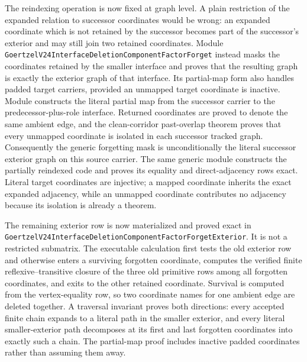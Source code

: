 \documentclass[11pt]{article}
\theoremstyle{definition}
\begin{document}
The reindexing operation is now fixed at graph level.  A plain restriction of
the expanded relation to successor coordinates would be wrong: an expanded
coordinate which is not retained by the successor becomes part of the
successor's exterior and may still join two retained coordinates.  Module
\texttt{GoertzelV24InterfaceDeletionComponentFactorForget} instead masks the
coordinates retained by the smaller interface and proves that the resulting
graph is exactly the exterior graph of that interface.  Its partial-map form
also handles padded target carriers, provided an unmapped target coordinate is
inactive.  Module
constructs the literal partial map from the successor carrier to the
predecessor-plus-role interface.  Returned coordinates are proved to denote
the same ambient edge, and the clean-corridor past-overlap theorem proves that
every unmapped coordinate is isolated in each successor tracked graph.
Consequently the generic forgetting mask is unconditionally the literal
successor exterior graph on this source carrier.  The same generic module
constructs the partially reindexed code and proves its equality and
direct-adjacency rows exact.  Literal target coordinates are injective; a
mapped coordinate inherits the exact expanded adjacency, while an unmapped
coordinate contributes no adjacency because its isolation is already a
theorem.

The remaining exterior row is now materialized and proved exact in
\texttt{GoertzelV24InterfaceDeletionComponentFactorForgetExterior}.  It is not
a restricted submatrix.  The executable calculation first tests the old
exterior row and otherwise enters a surviving forgotten coordinate, computes
the verified finite reflexive--transitive closure of the three old primitive
rows among all forgotten coordinates, and exits to the other retained
coordinate.  Survival is computed from the vertex-equality row, so two
coordinate names for one ambient edge are deleted together.  A traversal
invariant proves both directions: every accepted finite chain expands to a
literal path in the smaller exterior, and every literal smaller-exterior path
decomposes at its first and last forgotten coordinates into exactly such a
chain.  The partial-map proof includes inactive padded coordinates rather than
assuming them away.
\end{document}
